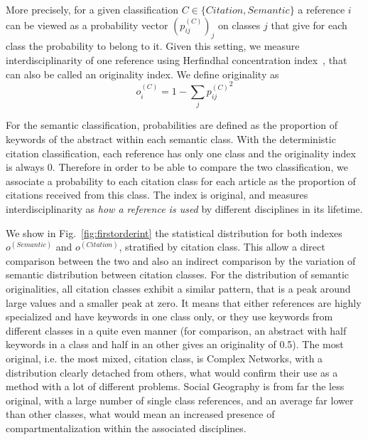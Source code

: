 More precisely, for a given classification $C \in \{ Citation,Semantic\}$ a reference $i$ can be viewed as a probability vector $(p_{ij}^{(C)})_j$ on classes $j$ that give for each class the probability to belong to it. Given this setting, we measure interdisciplinarity of one reference using Herfindhal concentration index~\citep{porter2009science}, that can also be called an originality index. We define originality as
\begin{equation}
o_i^{(C)} = 1 - \sum_j {p_{ij}^{(C)}}^2
\label{eq:interdisc}
\end{equation}

For the semantic classification, probabilities are defined as the proportion of keywords of the abstract within each semantic class. With the deterministic citation classification, each reference has only one class and the originality index is always 0. Therefore in order to be able to compare the two classification, we associate a probability to each citation class for each article as the proportion of citations received from this class. The index  is original, and measures interdisciplinarity as \emph{how a reference is used} by different disciplines in its lifetime. 


We show in Fig.~\ref{fig:firstorderint} the statistical distribution for both indexes $o^{(Semantic)}$ and $o^{(Citation)}$, stratified by citation class. This allow a direct comparison between the two and also an indirect comparison by the variation of semantic distribution between citation classes. For the distribution of semantic originalities, all citation classes exhibit a similar pattern, that is a peak around large values and a smaller peak at zero. It means that either references are highly specialized and have keywords in one class only, or they use keywords from different classes in a quite even manner (for comparison, an abstract with half keywords in a class and half in an other gives an originality of 0.5). The most original, i.e. the most mixed, citation class, is Complex Networks, with a distribution clearly detached from others, what would confirm their use as a method with a lot of different problems. Social Geography is from far the less original, with a large number of single class references, and an average far lower than other classes, what would mean an increased presence of compartmentalization within the associated disciplines.


